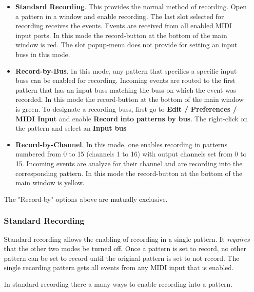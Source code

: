    \begin{itemize}
      \item \textbf{Standard Recording}.
         This provides the normal method of recording. Open a pattern in a
         window and enable recording.
         The last slot selected for recording receives the events.
         Events are received from all enabled MIDI input ports.
         In this mode the record-button at the bottom of the main window
         is red.
         The slot popup-menu does not provide for setting an input buss
         in this mode.
      \item \textbf{Record-by-Bus}.
         In this mode, any pattern that specifies a specific input buss
         can be enabled for recording.
         Incoming events are routed to the first pattern that has an input
         buss matching the buss on which the event was recorded.
         In this mode the record-button at the bottom of the main window
         is green.
         To designate a recording buss, first go to
         \textbf{Edit / Preferences / MIDI Input} and enable
         \textbf{Record into patterns by bus}.
         The right-click on the pattern and select an
         \textbf{Input bus}
      \item \textbf{Record-by-Channel}.
         In this mode, one enables recording in patterns numbered from 0 to 15
         (channels 1 to 16) with output channels set from 0 to 15.
         Incoming events are analyze for their channel and are recording into
         the corresponding pattern.
         In this mode the record-button at the bottom of the main window
         is yellow.
   \end{itemize}

   The "Record-by" options above are mutually exclusive.

\subsubsection{Standard Recording}
\label{subsubsec:recording_standard_recording}

   Standard recording allows the enabling of recording in a single pattern.
   It \textsl{requires} that the other two modes be turned off.
   Once a pattern is set to record, no other pattern can be set to record until
   the original pattern is set to not record.
   The single recording pattern gets all events from any MIDI
   input that is enabled.

   In standard recording there a many ways to enable recording into
   a pattern.

